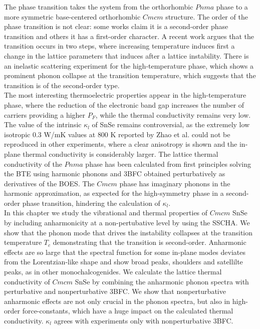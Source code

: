 The phase transition takes the system from the orthorhombic $Pnma$ phase to a more symmetric base-centered orthorhombic $Cmcm$ structure. The order of the phase transition is not clear: some works\cite{zhao2014ultralow,
adouby1998structure,chattopadhyay1986neutron,chatterji2018soft} claim it is a second-order phase transition and others\cite{von1981high} it has a first-order character. A recent work\cite{dewandre2016two} argues that the transition occurs in 
two steps, where increasing temperature induces first a change in the lattice parameters that induces after a lattice instability. There is an inelastic scattering experiment for the high-temperature phase, which shows a prominent phonon collapse at the transition temperature, which suggests that the transition is of the second-order type\cite{chatterji2018soft}. \\

The most interesting thermoelectric properties appear in the high-temperature phase, where the reduction of the electronic band gap increases the number of carriers providing a higher $P_{F}$, while the thermal conductivity 
remains very low. The value of the intrinsic $\kappa_{l}$ of SnSe remains controversial, as the extremely low isotropic $0.3$ W/mK values at $800$ K reported by Zhao et al.\cite{zhao2014ultralow} could not be reproduced in 
other experiments, where a clear anisotropy is shown and the in-plane thermal conductivity is considerably larger\cite{ibrahim2017reinvestigation,sassi2014assessment,chen2014thermoelectric}. The lattice thermal conductivity 
of the $Pnma$ phase has been calculated\cite{carrete2014low,skelton2016anharmonicity} from first principles solving the BTE using harmonic phonons and 3BFC obtained perturbatively as derivatives of the BOES. The $Cmcm$ phase 
has imaginary phonons in the harmonic approximation\cite{dewandre2016two,skelton2016anharmonicity,yu2016enhanced}, as expected for the high-symmetry phase in a second-order phase transition, hindering the 
calculation of $\kappa_{l}$. \\

In this chapter we study the vibrational and thermal properties of $Cmcm$ SnSe by including anharmonicity at a non-pertubative level by using the SSCHA. We show that the phonon mode that drives the instability collapses at the 
transition temperature $T_{c}$ demonstrating that the transition is second-order. Anharmonic effects are so large that the spectral function for some in-plane modes deviates from the Lorentzian-like shape and show broad peaks, 
shoulders and satellilte peaks, as in other monochalcogenides\cite{ribeiro2018strong,li2014phonon}. We calculate the lattice thermal conductivity of $Cmcm$ SnSe by combining the anharmonic phonon spectra with perturbative and 
nonperturbative 3BFC. We show that nonperturbative anharmonic effects are not only crucial in the phonon spectra, but also in high-order force-constants, which have a huge impact on the calculated thermal conductivity. 
$\kappa_{l}$ agrees with experiments\cite{ibrahim2017reinvestigation} only with nonperturbative 3BFC.

